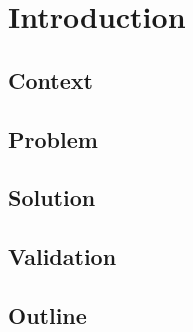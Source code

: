 \chapter{Introduction}
\label{cha:introduction}

\section{Context}
\label{cha:Context}

\section{Problem}
\label{cha:problem}

\section{Solution}
\label{cha:solution}

\section{Validation}
\label{cha:validation}

\section{Outline}
\label{cha:outline}